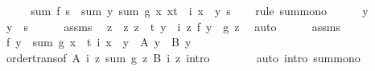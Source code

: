 \begin{isabellebody}
%
\isadelimproof
%
\endisadelimproof
%
\isatagproof
{}\isamarkupfalse%
\ {\isacharminus}{\kern0pt}\isanewline
\ \ \isamarkupfalse%
\ {\isachardoublequoteopen}sum\ f\ s\ {\isasymle}\ sum\ {\isacharparenleft}{\kern0pt}{\isasymlambda}y{\isachardot}{\kern0pt}\ sum\ g\ {\isacharbraceleft}{\kern0pt}x{\isachardot}{\kern0pt}\ x{\isasymin}t\ {\isasymand}\ i\ x\ {\isacharequal}{\kern0pt}\ y{\isacharbraceright}{\kern0pt}{\isacharparenright}{\kern0pt}\ s{\isachardoublequoteclose}\isanewline
\ \ \isamarkupfalse%
\ {\isacharparenleft}{\kern0pt}rule\ sum{\isacharunderscore}{\kern0pt}mono{\isacharparenright}{\kern0pt}\isanewline
\ \ \ \ \isamarkupfalse%
\ y\isanewline
\ \ \ \ \isamarkupfalse%
\ {\isachardoublequoteopen}y\ {\isasymin}\ s{\isachardoublequoteclose}\isanewline
\ \ \ \ \isamarkupfalse%
\ assms\ \isamarkupfalse%
\ z\ \ z{\isacharcolon}{\kern0pt}\ {\isachardoublequoteopen}z\ {\isasymin}\ t{\isachardoublequoteclose}\ {\isachardoublequoteopen}y\ {\isacharequal}{\kern0pt}\ i\ z{\isachardoublequoteclose}\ {\isachardoublequoteopen}f\ y\ {\isasymle}\ g\ z{\isachardoublequoteclose}\ \isamarkupfalse%
\ auto\isanewline
\ \ \ \ \isamarkupfalse%
\ assms\ \isamarkupfalse%
\ {\isachardoublequoteopen}f\ y\ {\isasymle}\ sum\ g\ {\isacharbraceleft}{\kern0pt}x\ {\isasymin}\ t{\isachardot}{\kern0pt}\ i\ x\ {\isacharequal}{\kern0pt}\ y{\isacharbraceright}{\kern0pt}{\isachardoublequoteclose}\ {\isacharparenleft}{\kern0pt}\ {\isachardoublequoteopen}{\isacharquery}{\kern0pt}A\ y\ {\isasymle}\ {\isacharquery}{\kern0pt}B\ y{\isachardoublequoteclose}{\isacharparenright}{\kern0pt}\isanewline
\ \ \ \ \ \ \isamarkupfalse%
\ order{\isacharunderscore}{\kern0pt}trans{\isacharbrackleft}{\kern0pt}of\ {\isachardoublequoteopen}{\isacharquery}{\kern0pt}A\ {\isacharparenleft}{\kern0pt}i\ z{\isacharparenright}{\kern0pt}{\isachardoublequoteclose}\ {\isachardoublequoteopen}sum\ g\ {\isacharbraceleft}{\kern0pt}z{\isacharbraceright}{\kern0pt}{\isachardoublequoteclose}\ {\isachardoublequoteopen}{\isacharquery}{\kern0pt}B\ {\isacharparenleft}{\kern0pt}i\ z{\isacharparenright}{\kern0pt}{\isachardoublequoteclose}{\isacharcomma}{\kern0pt}\ intro{\isacharbrackright}{\kern0pt}\isanewline
\ \ \ \ \ \ \isamarkupfalse%
\ {\isacharparenleft}{\kern0pt}auto\ intro{\isacharbang}{\kern0pt}{\isacharcolon}{\kern0pt}\ sum{\isacharunderscore}{\kern0pt}mono{}{\isacharparenright}{\kern0pt}\isanewline

\end{isabellebody}
